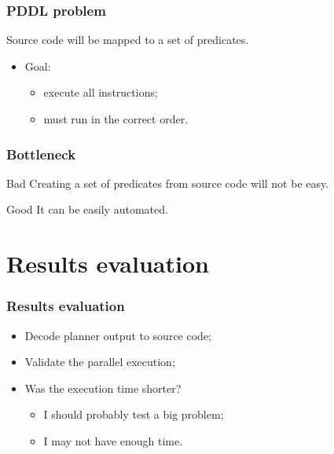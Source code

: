 \documentclass{beamer}
\begin{document}
\begin{frame}
  \frametitle{PDDL problem}

  Source code will be mapped to a set of predicates. \pause

  \begin{itemize}
    \item Goal:
          \begin{itemize}
            \item execute all instructions;
            \item must run in the correct order.
          \end{itemize}
  \end{itemize}
\end{frame}

\begin{frame}
  \frametitle{Bottleneck}

  \begin{alertblock}{Bad}
    Creating a set of predicates from source code will not be easy.
  \end{alertblock}

  \begin{block}{Good}
    It can be easily automated.
  \end{block}
\end{frame}


\section{Results evaluation}

\begin{frame}
  \frametitle{Results evaluation}

  \begin{itemize}
    \item Decode planner output to source code;
    \item Validate the parallel execution;
    \item Was the execution time shorter?
          \begin{itemize}
            \item I should probably test a big problem;
            \item I may not have enough time.
          \end{itemize}
  \end{itemize}
\end{frame}
\end{document}

